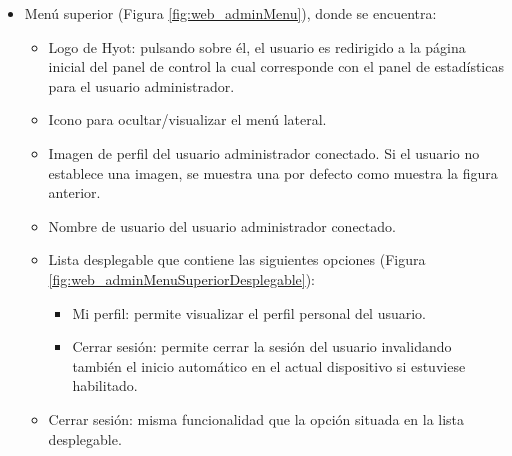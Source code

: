 \documentclass[12pt,a4paper, twoside]{report}
\begin{document}
	\begin{itemize}
		\item Menú superior (Figura \ref{fig:web_adminMenu}), donde se encuentra: 
		 
			
			\begin{itemize}
				\item Logo de Hyot: pulsando sobre él, el usuario es redirigido a la página inicial del panel de control la cual corresponde con el panel de estadísticas para el usuario administrador.
				\item Icono para ocultar/visualizar el menú lateral.
				\item Imagen de perfil del usuario administrador conectado. Si el usuario no establece una imagen, se muestra una por defecto como muestra la figura anterior.
				\item Nombre de usuario del usuario administrador conectado.
				\item Lista desplegable que contiene las siguientes opciones (Figura \ref{fig:web_adminMenuSuperiorDesplegable}):
				
			
				\begin{itemize}
					\item Mi perfil: permite visualizar el perfil personal del usuario.
					\item Cerrar sesión: permite cerrar la sesión del usuario invalidando también el inicio automático en el actual dispositivo si estuviese habilitado.
				\end{itemize}
				\item Cerrar sesión: misma funcionalidad que la opción situada en la lista desplegable.
			\end{itemize}


\end{itemize}
\end{document}
